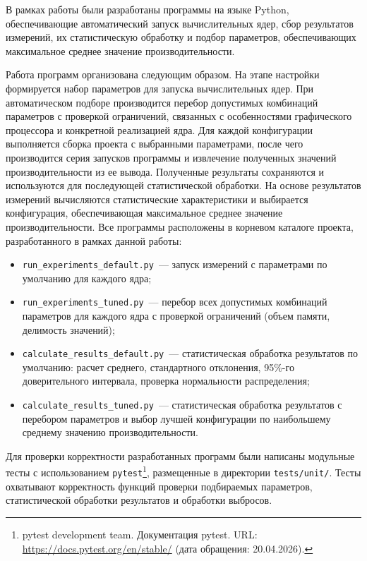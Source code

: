 \documentclass[a4paper]{article}
\begin{document}
В рамках работы были разработаны программы на языке Python, обеспечивающие автоматический запуск вычислительных ядер, сбор результатов измерений, их статистическую обработку и подбор параметров, обеспечивающих максимальное среднее значение производительности.

Работа программ организована следующим образом. На этапе настройки формируется набор параметров для запуска вычислительных ядер. При автоматическом подборе производится перебор допустимых комбинаций параметров с проверкой ограничений, связанных с особенностями графического процессора и конкретной реализацией ядра. Для каждой конфигурации выполняется сборка проекта с выбранными параметрами, после чего производится серия запусков программы и извлечение полученных значений производительности из ее вывода. Полученные результаты сохраняются и используются для последующей статистической обработки. На основе результатов измерений вычисляются статистические характеристики и выбирается конфигурация, обеспечивающая максимальное среднее значение производительности. Все программы расположены в корневом каталоге проекта, разработанного в рамках данной работы:

\begin{itemize}
\item \texttt{run\_experiments\_default.py}~--- запуск измерений с параметрами по умолчанию для каждого ядра;
\item \texttt{run\_experiments\_tuned.py}~--- перебор всех допустимых комбинаций параметров для каждого ядра с проверкой ограничений (объем памяти, делимость значений);
\item \texttt{calculate\_results\_default.py}~--- статистическая обработка результатов по умолчанию: расчет среднего, стандартного отклонения, 95\%-го доверительного интервала, проверка нормальности распределения;
\item \texttt{calculate\_results\_tuned.py}~--- статистическая обработка результатов с перебором параметров и выбор лучшей конфигурации по наибольшему среднему значению производительности.
\end{itemize}

Для проверки корректности разработанных программ были написаны модульные тесты с использованием \texttt{pytest}\footnote{pytest development team. Документация pytest. URL: \url{https://docs.pytest.org/en/stable/} (дата обращения: 20.04.2026).}, размещенные в директории \texttt{tests/unit/}. Тесты охватывают корректность функций проверки подбираемых параметров, статистической обработки результатов и обработки выбросов.
\end{document}
